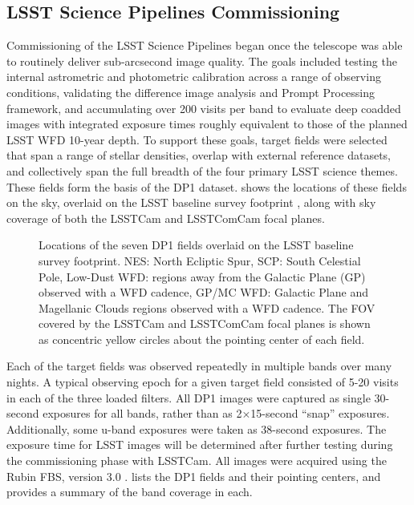 \subsection{LSST Science Pipelines Commissioning
\label{ssec:pipelines_commissioning}}
Commissioning of the \gls{LSST Science Pipelines} \citep{PSTN-019} began once the telescope was able to routinely deliver sub-arcsecond image quality.
The goals included testing the internal astrometric and photometric calibration across a range of observing conditions, validating the difference image analysis and Prompt Processing \citep{dmtn-219} framework, and accumulating over 200 visits per band to evaluate deep coadded images with integrated exposure times roughly equivalent to those of the planned LSST \gls{WFD} 10-year depth.
To support these goals, \nfields target fields were selected that span a range of stellar densities, overlap with external reference datasets, and collectively span the full breadth of the four primary \gls{LSST} science themes.
These \nfields fields form the basis of the \gls{DP1} dataset.
 shows the locations of these \nfields fields on the sky, overlaid on the LSST baseline survey footprint \citep{PSTN-051, PSTN-052, PSTN-053, PSTN-055, PSTN-056}, along with sky coverage of both the LSSTCam and \gls{LSSTComCam} focal planes.
\begin{figure*}[bt!]
\centering
{}
\caption{Locations of the seven DP1 fields overlaid on the \gls{LSST} baseline survey footprint. NES: North Ecliptic Spur, SCP: South Celestial Pole, Low-Dust WFD: regions away from the Galactic Plane (GP) observed with a WFD cadence, GP/MC WFD: Galactic Plane and Magellanic Clouds regions observed with a WFD cadence. The \gls{FOV} covered by the \gls{LSSTCam} and \gls{LSSTComCam} focal planes is shown as concentric yellow circles about the pointing center of each field.}
\label{fig:dp1_fields_on_sky}
\end{figure*}
Each of the \nfields target fields was observed repeatedly in multiple bands over many nights.
A typical observing \gls{epoch} for a given target field consisted of 5-20 visits in each of the three loaded filters.
All DP1 images were captured as single 30-second exposures for all bands, rather than as 2×15-second “snap” exposures.
Additionally, some u-band exposures were taken as 38-second exposures.
The exposure time for LSST images will be determined after further testing during the commissioning phase with LSSTCam. 
All images were acquired using the Rubin \gls{FBS}, version 3.0 \citep{Naghib_2019, peter_yoachim_2024_13985198}.
 lists the \nfields \gls{DP1} fields and their pointing centers, and provides a summary of the band coverage in each.


